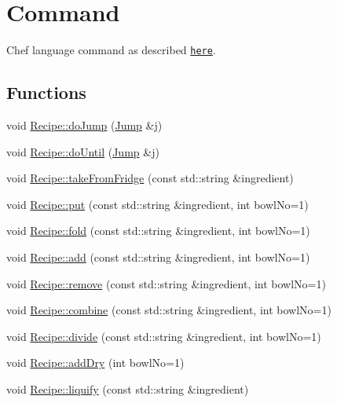 \hypertarget{group__Command}{\section{Command}
\label{group__Command}
}


Chef language command as described \href{http://www.dangermouse.net/esoteric/chef.html}{\tt here}.  


\subsection*{Functions}
\begin{DoxyCompactItemize}
\item 
void \hyperlink{group__Command_ga003607cfe3ab13de0bc6b85d659856bc}{Recipe\-::do\-Jump} (\hyperlink{structJump}{Jump} \&j)
\item 
void \hyperlink{group__Command_gadad4684f1b60dbabd7ac9b8ac9816d32}{Recipe\-::do\-Until} (\hyperlink{structJump}{Jump} \&j)
\item 
void \hyperlink{group__Command_gac3113fc72f93de181c7064c840fda35d}{Recipe\-::take\-From\-Fridge} (const std\-::string \&ingredient)
\item 
void \hyperlink{group__Command_ga30b29697e66c0cd365a52f6ea0779081}{Recipe\-::put} (const std\-::string \&ingredient, int bowl\-No=1)
\item 
void \hyperlink{group__Command_gac4b62604279d9c5b3547b431b8954ff7}{Recipe\-::fold} (const std\-::string \&ingredient, int bowl\-No=1)
\item 
void \hyperlink{group__Command_gab16e0a2d2ea903340d8f4249301c4b4b}{Recipe\-::add} (const std\-::string \&ingredient, int bowl\-No=1)
\item 
void \hyperlink{group__Command_gac6fb6dbdc7029c128dd3f1c9baf81db0}{Recipe\-::remove} (const std\-::string \&ingredient, int bowl\-No=1)
\item 
void \hyperlink{group__Command_ga4ef5821d2d54f6370b120d2044396562}{Recipe\-::combine} (const std\-::string \&ingredient, int bowl\-No=1)
\item 
void \hyperlink{group__Command_ga02cee3468892d727f827f7ad6e3d2f1d}{Recipe\-::divide} (const std\-::string \&ingredient, int bowl\-No=1)
\item 
void \hyperlink{group__Command_ga7c657ea9ec19dfb55292a7474fe12511}{Recipe\-::add\-Dry} (int bowl\-No=1)
\item 
void \hyperlink{group__Command_ga18eed9f7920c0a2b94a16f467b7faf1b}{Recipe\-::liquify} (const std\-::string \&ingredient)

\end{DoxyCompactItemize}
